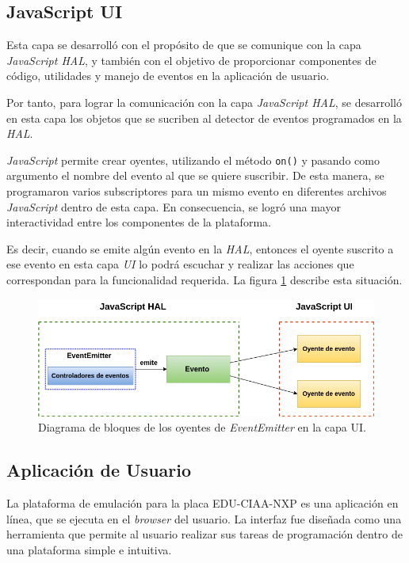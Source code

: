  
 

\subsection{JavaScript UI}

Esta capa se desarrolló con el propósito de que se comunique con la capa \textit{JavaScript HAL}, y también con el objetivo de proporcionar componentes de código, utilidades y manejo de eventos en la aplicación de usuario.

Por tanto, para lograr la comunicación con la capa \textit{JavaScript HAL}, se desarrolló en esta capa los objetos que se sucriben al detector de eventos programados en la \textit{HAL}.

\textit{JavaScript} permite crear oyentes, utilizando el método \texttt{on()} y pasando como argumento el nombre del evento al que se quiere suscribir. De esta manera, se  programaron varios subscriptores para un mismo evento en diferentes archivos \textit{JavaScript} dentro de esta capa. En consecuencia, se logró una mayor interactividad entre los componentes de la plataforma.

Es decir, cuando se emite algún evento en la \textit{HAL}, entonces el oyente suscrito a ese evento en esta capa \textit{UI} lo podrá escuchar y realizar las acciones que correspondan para la funcionalidad requerida. La figura \ref{fig:EventemitterNodeJSUI} describe esta situación.

\hfill \break
\hfill \break
\hfill \break
\hfill \break
\hfill \break
\hfill \break
\hfill \break
\hfill \break

\begin{figure}[ht]
	\centering
	\includegraphics[scale=.52]{./Figures/EventemitterNodeJSUI.png}
	\caption{Diagrama de bloques de los oyentes de \textit{EventEmitter} en la capa UI.}
	\label{fig:EventemitterNodeJSUI}
\end{figure}




\subsection{Aplicación de Usuario}
La plataforma de emulación para la placa EDU-CIAA-NXP es una aplicación en línea, que se ejecuta en el \textit{browser} del usuario. La interfaz fue diseñada como una herramienta que permite al usuario realizar sus tareas de programación dentro de una plataforma simple e intuitiva.

